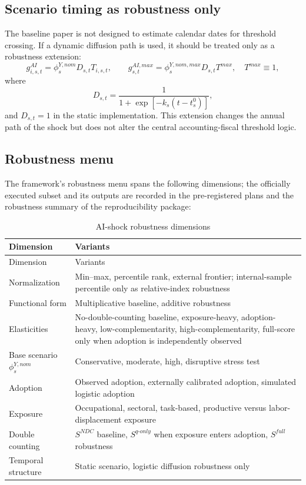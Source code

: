 \documentclass[11pt,a4paper]{article}
\begin{document}
\subsection{Scenario timing as robustness only}

The baseline paper is not designed to estimate calendar dates for threshold crossing. If a dynamic diffusion path is used, it should be treated only as a robustness extension:
\begin{equation}
    g^{AI}_{i,s,t}=\phi^{Y,nom}_s D_{s,t}T_{i,s,t},
    \qquad g^{AI,max}_{s,t}=\phi^{Y,nom,max}_sD_{s,t}T^{max},\quad T^{max}\equiv1,
\end{equation}
where
\begin{equation}
    D_{s,t}=\frac{1}{1+\exp[-k_s(t-t^0_s)]},
\end{equation}
and $D_{s,t}=1$ in the static implementation.
This extension changes the annual path of the shock but does not alter the central accounting-fiscal threshold logic.

\subsection{Robustness menu}

The framework's robustness menu spans the following dimensions; the officially executed subset and its outputs are recorded in the pre-registered plans and the robustness summary of the reproducibility package:
\begin{longtable}{p{}p{}}
\caption{AI-shock robustness dimensions}\label{tab:ai_shock_robustness}\\
\toprule
Dimension & Variants \\
\midrule
\endfirsthead
\toprule
Dimension & Variants \\
\midrule
\endhead
Normalization & Min--max, percentile rank, external frontier; internal-sample percentile only as relative-index robustness \\
Functional form & Multiplicative baseline, additive robustness \\
Elasticities & No-double-counting baseline, exposure-heavy, adoption-heavy, low-complementarity, high-complementarity, full-score only when adoption is independently observed \\
Base scenario $\phi^{Y,nom}_s$ & Conservative, moderate, high, disruptive stress test \\
Adoption & Observed adoption, externally calibrated adoption, simulated logistic adoption \\
Exposure & Occupational, sectoral, task-based, productive versus labor-displacement exposure \\
Double counting & $S^{NDC}$ baseline, $S^{q\text{-}only}$ when exposure enters adoption, $S^{full}$ robustness \\
Temporal structure & Static scenario, logistic diffusion robustness only \\
\bottomrule
\end{longtable}
\end{document}
